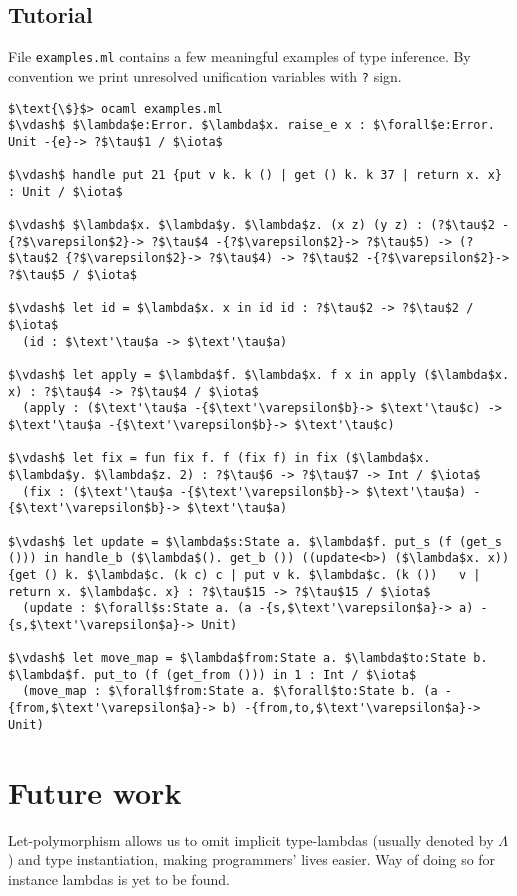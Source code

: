 \documentclass[declaration,shortabstract]{iithesis}
\theoremstyle{definition} \newtheorem{definition}{Definition}[section]
\begin{document}
\section{Tutorial}
File \texttt{examples.ml} contains a few meaningful examples of type inference.
By convention we print unresolved unification variables with \texttt{?} sign.
\begin{lstlisting}
$\text{\$}$> ocaml examples.ml 
$\vdash$ $\lambda$e:Error. $\lambda$x. raise_e x : $\forall$e:Error. Unit -{e}-> ?$\tau$1 / $\iota$

$\vdash$ handle put 21 {put v k. k () | get () k. k 37 | return x. x} : Unit / $\iota$

$\vdash$ $\lambda$x. $\lambda$y. $\lambda$z. (x z) (y z) : (?$\tau$2 -{?$\varepsilon$2}-> ?$\tau$4 -{?$\varepsilon$2}-> ?$\tau$5) -> (?$\tau$2 {?$\varepsilon$2}-> ?$\tau$4) -> ?$\tau$2 -{?$\varepsilon$2}-> ?$\tau$5 / $\iota$

$\vdash$ let id = $\lambda$x. x in id id : ?$\tau$2 -> ?$\tau$2 / $\iota$
  (id : $\text'\tau$a -> $\text'\tau$a)

$\vdash$ let apply = $\lambda$f. $\lambda$x. f x in apply ($\lambda$x. x) : ?$\tau$4 -> ?$\tau$4 / $\iota$
  (apply : ($\text'\tau$a -{$\text'\varepsilon$b}-> $\text'\tau$c) -> $\text'\tau$a -{$\text'\varepsilon$b}-> $\text'\tau$c)

$\vdash$ let fix = fun fix f. f (fix f) in fix ($\lambda$x. $\lambda$y. $\lambda$z. 2) : ?$\tau$6 -> ?$\tau$7 -> Int / $\iota$
  (fix : ($\text'\tau$a -{$\text'\varepsilon$b}-> $\text'\tau$a) -{$\text'\varepsilon$b}-> $\text'\tau$a)

$\vdash$ let update = $\lambda$s:State a. $\lambda$f. put_s (f (get_s ())) in handle_b ($\lambda$(). get_b ()) ((update<b>) ($\lambda$x. x)){get () k. $\lambda$c. (k c) c | put v k. $\lambda$c. (k ())   v | return x. $\lambda$c. x} : ?$\tau$15 -> ?$\tau$15 / $\iota$
  (update : $\forall$s:State a. (a -{s,$\text'\varepsilon$a}-> a) -{s,$\text'\varepsilon$a}-> Unit)

$\vdash$ let move_map = $\lambda$from:State a. $\lambda$to:State b. $\lambda$f. put_to (f (get_from ())) in 1 : Int / $\iota$
  (move_map : $\forall$from:State a. $\forall$to:State b. (a -{from,$\text'\varepsilon$a}-> b) -{from,to,$\text'\varepsilon$a}-> Unit)
\end{lstlisting}

\chapter{Future work}
Let-polymorphism allows us to omit implicit type-lambdas
(usually denoted by $\Lambda$) and type instantiation, making programmers'
lives easier.
Way of doing so for instance lambdas is yet to be found.
\end{document}
